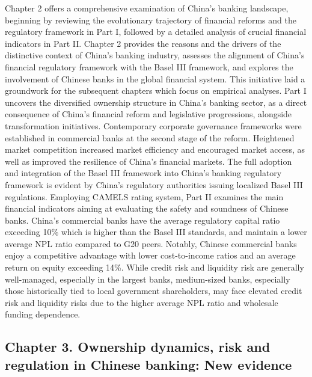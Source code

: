 \documentclass[
  letterpaper,
  DIV=11,
  numbers=noendperiod]{scrreprt}
\begin{document}
Chapter 2 offers a comprehensive examination of China's banking
landscape, beginning by reviewing the evolutionary trajectory of
financial reforms and the regulatory framework in Part I, followed by a
detailed analysis of crucial financial indicators in Part II. Chapter 2
provides the reasons and the drivers of the distinctive context of
China's banking industry, assesses the alignment of China's financial
regulatory framework with the Basel III framework, and explores the
involvement of Chinese banks in the global financial system. This
initiative laid a groundwork for the subsequent chapters which focus on
empirical analyses. Part I uncovers the diversified ownership structure
in China's banking sector, as a direct consequence of China's financial
reform and legislative progressions, alongside transformation
initiatives. Contemporary corporate governance frameworks were
established in commercial banks at the second stage of the reform.
Heightened market competition increased market efficiency and encouraged
market access, as well as improved the resilience of China's financial
markets. The full adoption and integration of the Basel III framework
into China's banking regulatory framework is evident by China's
regulatory authorities issuing localized Basel III regulations.
Employing CAMELS rating system, Part II examines the main financial
indicators aiming at evaluating the safety and soundness of Chinese
banks. China's commercial banks have the average regulatory capital
ratio exceeding 10\% which is higher than the Basel III standards, and
maintain a lower average NPL ratio compared to G20 peers. Notably,
Chinese commercial banks enjoy a competitive advantage with lower
cost-to-income ratios and an average return on equity exceeding 14\%.
While credit risk and liquidity risk are generally well-managed,
especially in the largest banks, medium-sized banks, especially those
historically tied to local government shareholders, may face elevated
credit risk and liquidity risks due to the higher average NPL ratio and
wholesale funding dependence.

\subsection{Chapter 3. Ownership dynamics, risk and regulation in
Chinese banking: New
evidence}\label{chapter-3.-ownership-dynamics-risk-and-regulation-in-chinese-banking-new-evidence}
\end{document}
